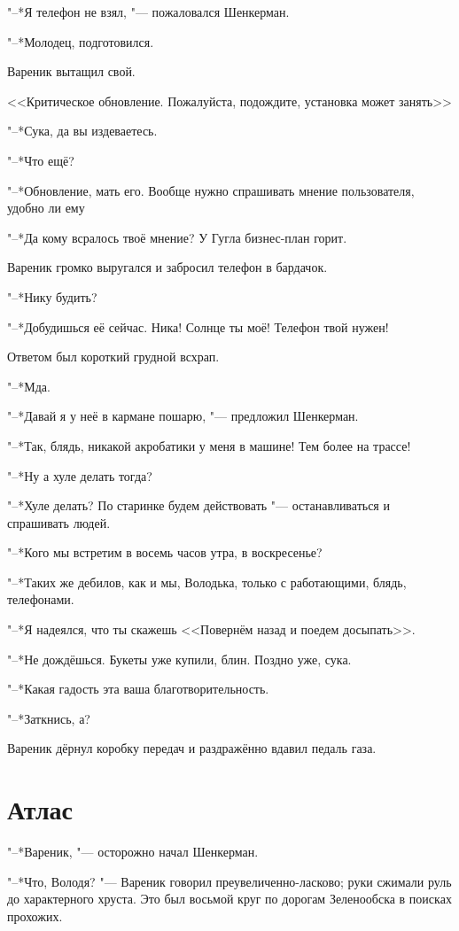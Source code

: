 "--*Я телефон не взял, "--- пожаловался Шенкерман.

"--*Молодец, подготовился.

Вареник вытащил свой.

<<Критическое обновление.
Пожалуйста, подождите, установка может занять\ldotst>>

"--*Сука, да вы издеваетесь.

"--*Что ещё?

"--*Обновление, мать его.
Вообще нужно спрашивать мнение пользователя, удобно ли ему\ldotst

"--*Да кому всралось твоё мнение?
У Гугла бизнес-план горит.

Вареник громко выругался и забросил телефон в бардачок.

"--*Нику будить?

"--*Добудишься её сейчас.
Ника!
Солнце ты моё!
Телефон твой нужен!

Ответом был короткий грудной всхрап.

"--*Мда.

"--*Давай я у неё в кармане пошарю, "--- предложил Шенкерман.

"--*Так, блядь, никакой акробатики у меня в машине!
Тем более на трассе!

"--*Ну а хуле делать тогда?

"--*Хуле делать?
По старинке будем действовать "--- останавливаться и спрашивать людей.

"--*Кого мы встретим в восемь часов утра, в воскресенье?

"--*Таких же дебилов, как и мы, Володька, только с работающими, блядь, телефонами.

"--*Я надеялся, что ты скажешь <<Повернём назад и поедем досыпать>>.

"--*Не дождёшься.
Букеты уже купили, блин.
Поздно уже, сука.

"--*Какая гадость эта ваша благотворительность.

"--*Заткнись, а?

Вареник дёрнул коробку передач и раздражённо вдавил педаль газа.

\section{Атлас}

"--*Вареник, "--- осторожно начал Шенкерман.

"--*Что, Володя? "--- Вареник говорил преувеличенно-ласково;
руки сжимали руль до характерного хруста.
Это был восьмой круг по дорогам Зеленообска в поисках прохожих.

